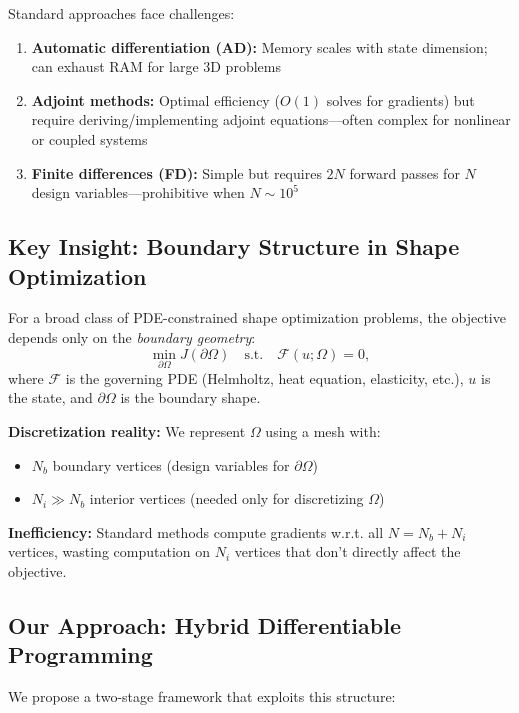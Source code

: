 \documentclass{article}
\begin{document}
Standard approaches face challenges:
\begin{enumerate}
    \item \textbf{Automatic differentiation (AD):} Memory scales with state dimension; can exhaust RAM for large 3D problems
    \item \textbf{Adjoint methods:} Optimal efficiency ($O(1)$ solves for gradients) but require deriving/implementing adjoint equations—often complex for nonlinear or coupled systems
    \item \textbf{Finite differences (FD):} Simple but requires $2N$ forward passes for $N$ design variables—prohibitive when $N \sim 10^5$
\end{enumerate}

\subsection{Key Insight: Boundary Structure in Shape Optimization}

For a broad class of PDE-constrained shape optimization problems, the objective depends only on the \emph{boundary geometry}:
\begin{equation}
    \min_{\partial\Omega} J(\partial\Omega) \quad \text{s.t.} \quad \mathcal{F}(u; \Omega) = 0,
    \label{eq:general_problem}
\end{equation}
where $\mathcal{F}$ is the governing PDE (Helmholtz, heat equation, elasticity, etc.), $u$ is the state, and $\partial\Omega$ is the boundary shape.

\textbf{Discretization reality:} We represent $\Omega$ using a mesh with:
\begin{itemize}
    \item $N_b$ boundary vertices (design variables for $\partial\Omega$)
    \item $N_i \gg N_b$ interior vertices (needed only for discretizing $\Omega$)
\end{itemize}

\textbf{Inefficiency:} Standard methods compute gradients w.r.t. all $N = N_b + N_i$ vertices, wasting computation on $N_i$ vertices that don't directly affect the objective.

\subsection{Our Approach: Hybrid Differentiable Programming}

We propose a two-stage framework that exploits this structure:
\end{document}
